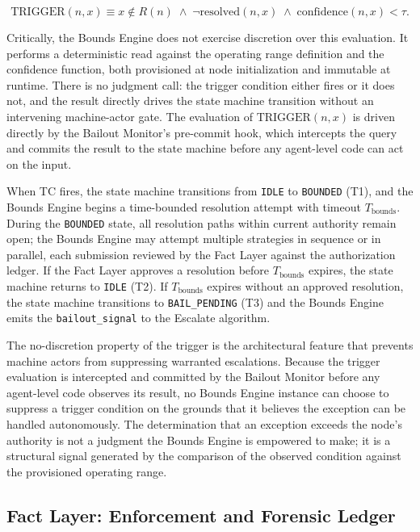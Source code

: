 \begin{equation}
\text{TRIGGER}(n, x) \equiv x \notin R(n) \;\land\; \neg\text{resolved}(n, x) \;\land\;
\text{confidence}(n, x) < \tau .
\tag{TC}
\end{equation}

Critically, the Bounds Engine does not exercise discretion over this
evaluation.  It performs a deterministic read against the operating range
definition and the confidence function, both provisioned at node initialization
and immutable at runtime.  There is no judgment call: the trigger condition
either fires or it does not, and the result directly drives the state machine
transition without an intervening machine-actor gate.  The evaluation of
$\text{TRIGGER}(n, x)$ is driven directly by the Bailout Monitor's pre-commit
hook, which intercepts the query and commits the result to the state machine
before any agent-level code can act on the input.

When TC fires, the state machine transitions from \texttt{IDLE} to
\texttt{BOUNDED} (T1), and the Bounds Engine begins a time-bounded resolution
attempt with timeout $T_{\text{bounds}}$.  During the \texttt{BOUNDED} state, all
resolution paths within current authority remain open; the Bounds Engine may
attempt multiple strategies in sequence or in parallel, each submission reviewed
by the Fact Layer against the authorization ledger.  If the Fact Layer approves
a resolution before $T_{\text{bounds}}$ expires, the state machine returns to
\texttt{IDLE} (T2).  If $T_{\text{bounds}}$ expires without an approved
resolution, the state machine transitions to \texttt{BAIL\_PENDING} (T3) and the
Bounds Engine emits the \texttt{bailout\_signal} to the Escalate algorithm.

The no-discretion property of the trigger is the architectural feature that
prevents machine actors from suppressing warranted escalations.  Because the
trigger evaluation is intercepted and committed by the Bailout Monitor before any
agent-level code observes its result, no Bounds Engine instance can choose to
suppress a trigger condition on the grounds that it believes the exception can be
handled autonomously.  The determination that an exception exceeds the node's
authority is not a judgment the Bounds Engine is empowered to make; it is a
structural signal generated by the comparison of the observed condition against
the provisioned operating range.

\subsection{Fact Layer: Enforcement and Forensic Ledger}
\label{sec:bailout-fact-layer}

